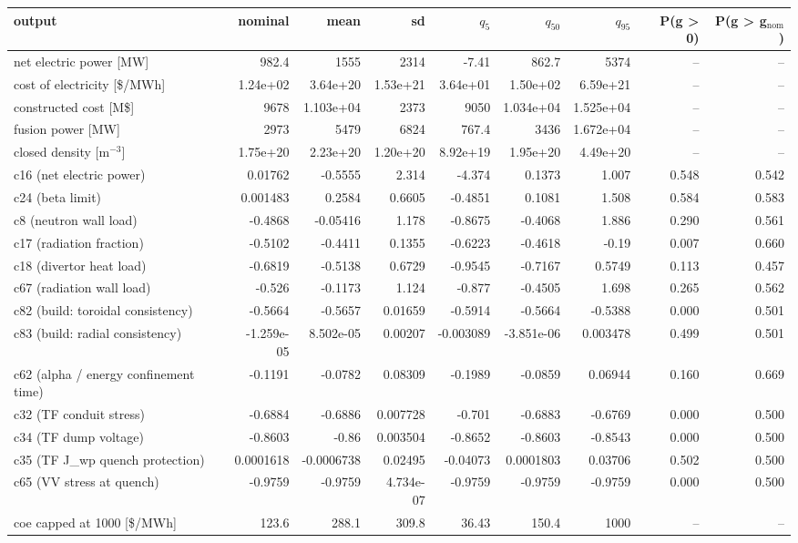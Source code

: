 \begin{tabular}{lrrrrrrrr}
\toprule
output & nominal & mean & sd & $q_{5}$ & $q_{50}$ & $q_{95}$ & P(g > 0) & P(g > g$_\mathrm{nom}$) \\
\midrule
net electric power [MW] & 982.4 & 1555 & 2314 & -7.41 & 862.7 & 5374 & -- & -- \\
cost of electricity [\$/MWh] & 1.24e+02 & 3.64e+20 & 1.53e+21 & 3.64e+01 & 1.50e+02 & 6.59e+21 & -- & -- \\
constructed cost [M\$] & 9678 & 1.103e+04 & 2373 & 9050 & 1.034e+04 & 1.525e+04 & -- & -- \\
fusion power [MW] & 2973 & 5479 & 6824 & 767.4 & 3436 & 1.672e+04 & -- & -- \\
closed density [m$^{-3}$] & 1.75e+20 & 2.23e+20 & 1.20e+20 & 8.92e+19 & 1.95e+20 & 4.49e+20 & -- & -- \\
c16 (net electric power) & 0.01762 & -0.5555 & 2.314 & -4.374 & 0.1373 & 1.007 & 0.548 & 0.542 \\
c24 (beta limit) & 0.001483 & 0.2584 & 0.6605 & -0.4851 & 0.1081 & 1.508 & 0.584 & 0.583 \\
c8 (neutron wall load) & -0.4868 & -0.05416 & 1.178 & -0.8675 & -0.4068 & 1.886 & 0.290 & 0.561 \\
c17 (radiation fraction) & -0.5102 & -0.4411 & 0.1355 & -0.6223 & -0.4618 & -0.19 & 0.007 & 0.660 \\
c18 (divertor heat load) & -0.6819 & -0.5138 & 0.6729 & -0.9545 & -0.7167 & 0.5749 & 0.113 & 0.457 \\
c67 (radiation wall load) & -0.526 & -0.1173 & 1.124 & -0.877 & -0.4505 & 1.698 & 0.265 & 0.562 \\
c82 (build: toroidal consistency) & -0.5664 & -0.5657 & 0.01659 & -0.5914 & -0.5664 & -0.5388 & 0.000 & 0.501 \\
c83 (build: radial consistency) & -1.259e-05 & 8.502e-05 & 0.00207 & -0.003089 & -3.851e-06 & 0.003478 & 0.499 & 0.501 \\
c62 (alpha / energy confinement time) & -0.1191 & -0.0782 & 0.08309 & -0.1989 & -0.0859 & 0.06944 & 0.160 & 0.669 \\
c32 (TF conduit stress) & -0.6884 & -0.6886 & 0.007728 & -0.701 & -0.6883 & -0.6769 & 0.000 & 0.500 \\
c34 (TF dump voltage) & -0.8603 & -0.86 & 0.003504 & -0.8652 & -0.8603 & -0.8543 & 0.000 & 0.500 \\
c35 (TF J\_wp quench protection) & 0.0001618 & -0.0006738 & 0.02495 & -0.04073 & 0.0001803 & 0.03706 & 0.502 & 0.500 \\
c65 (VV stress at quench) & -0.9759 & -0.9759 & 4.734e-07 & -0.9759 & -0.9759 & -0.9759 & 0.000 & 0.500 \\
coe capped at 1000 [\$/MWh] & 123.6 & 288.1 & 309.8 & 36.43 & 150.4 & 1000 & -- & -- \\
\bottomrule
\end{tabular}

